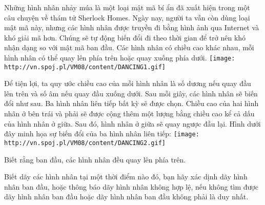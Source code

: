 Những hình nhân nhảy múa là một loại mật mã bí ẩn đã xuất hiện trong một câu chuyện về thám tử Sherlock Homes.  Ngày nay, người ta vẫn còn dùng loại mật mã này, nhưng các hình nhân được truyền đi bằng hình ảnh qua Internet và khó giải mã hơn. Chúng sẽ tự động biến đổi đi theo thời gian để trở nên khó nhận dạng so với mật mã ban đầu. Các hình nhân có chiều cao khác nhau, mỗi hình nhân có thể quay lên phía trên hoặc quay xuống phía dưới.  
\texttt{[image: http://vn.spoj.pl/VM08/content/DANCING1.gif]}

   Để tiện lợi, ta quy ước chiều cao của mỗi hình nhân là số dương nếu quay đầu lên trên và số âm nếu quay đầu xuống dưới.  Sau mỗi giây, các hình nhân sẽ biến đổi như sau. Ba hình nhân liên tiếp bất kỳ sẽ được chọn. Chiều cao của hai hình nhân ở bên trái và phải sẽ được cộng thêm một lượng bằng       chiều cao kể cả dấu      của hình nhân ở giữa. Sau đó, hình nhân ở giữa sẽ quay ngược đầu lại. Hình dưới đây minh họa sự biến đổi của ba hình nhân liên tiếp:  
\texttt{[image: http://vn.spoj.pl/VM08/content/DANCING2.gif]}

   Biết rằng ban đầu, các hình nhân       đều quay lên phía trên.     

   Biết dãy các hình nhân tại một thời điểm nào đó, bạn hãy xác dịnh dãy hình nhân ban đầu, hoặc thông báo dãy hình nhân không hợp lệ, nếu không tìm được dãy hình nhân ban đầu hoặc dãy hình nhân ban đầu không phải là duy nhất.